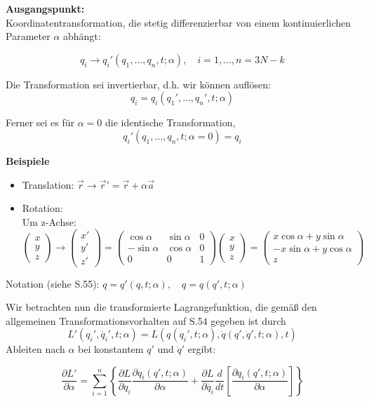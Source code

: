 \documentclass[10pt, letterpaper]{article}
\begin{document}
\textbf{Ausgangspunkt:}\\
Koordinatentransformation, die stetig differenzierbar von einem kontinuierlichen Parameter $\alpha$ abhängt:

\[q_i \to q_i'(q_1,\ldots,q_n,t;\alpha), \quad i=1,\ldots,n = 3N-k\]

Die Transformation sei invertierbar, d.h. wir können auflösen:
\[q_i = q_i(q_1',\ldots,q_n',t;\alpha)\]

Ferner sei es für $\alpha=0$ die identische Transformation,
\[q_i'(q_1,\ldots,q_n,t;\alpha=0) = q_i\]

\textbf{Beispiele}
\begin{itemize}
\item Translation: $\vec{r} \to \vec{r}' = \vec{r} + \alpha\vec{a}$
\item Rotation:\\
Um z-Achse: $\begin{pmatrix} x \\ y \\ z \end{pmatrix} \to \begin{pmatrix} x' \\ y' \\ z' \end{pmatrix} = \begin{pmatrix} \cos\alpha & \sin\alpha & 0 \\ -\sin\alpha & \cos\alpha & 0 \\ 0 & 0 & 1 \end{pmatrix} \begin{pmatrix} x \\ y \\ z \end{pmatrix} = \begin{pmatrix} x\cos\alpha+y\sin\alpha \\ -x\sin\alpha+y\cos\alpha \\ z \end{pmatrix}$
\end{itemize}

Notation (siehe S.55): $q = q'(q,t;\alpha), \quad q = q(q',t;\alpha)$

Wir betrachten nun die transformierte Lagrangefunktion, die gemäß den allgemeinen Transformationsvorhalten auf S.54 gegeben ist durch
\[L'(q_i',\dot{q_i}',t;\alpha) = L(q(q_i',t;\alpha), \dot{q}(q',\dot{q}',t;\alpha), t)\]
Ableiten nach $\alpha$ bei konstantem $q'$ und $\dot{q}'$ ergibt:

\[\frac{\partial L'}{\partial \alpha} = \sum_{i=1}^n \left\{\frac{\partial L}{\partial q_i}\frac{\partial q_i(q',t;\alpha)}{\partial \alpha} + \frac{\partial L}{\partial \dot{q_i}}\frac{d}{dt}\left[\frac{\partial q_i(q',t;\alpha)}{\partial \alpha}\right]\right\}\]
\end{document}
